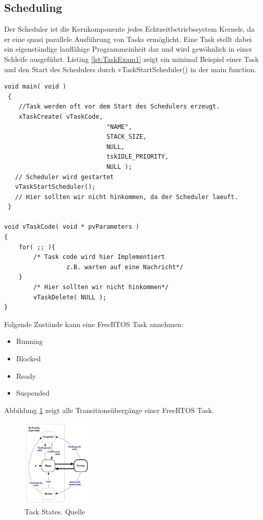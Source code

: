 \subsection{Scheduling}
\label{Scheduling}
Der Scheduler ist die Kernkomponente jedes Echtzeitbetriebssystem Kernels, da er eine quasi parallele Ausführung von Tasks ermöglicht. Eine Task stellt dabei ein ei\-gen\-stän\-di\-ge lauffähige Programmeinheit dar und wird gewöhnlich in einer Schleife ausgeführt. Listing \ref{lst:TaskExam1} zeigt ein minimal Beispiel einer Task und den Start des Schedulers durch vTaskStartScheduler() in der main function. 
\begin{lstlisting}[caption={Minimal Beispiel für die Definition eine Task. }, linewidth=8cm,captionpos=b, label=lst:TaskExam1, float=hbt]
 void main( void )
 {
	//Task werden oft vor dem Start des Schedulers erzeugt.
	xTaskCreate( vTaskCode,
							"NAME",
							STACK_SIZE,
							NULL,
							tskIDLE_PRIORITY,
							NULL );
   // Scheduler wird gestartet
   vTaskStartScheduler();
   // Hier sollten wir nicht hinkommen, da der Scheduler laeuft.
 }

void vTaskCode( void * pvParameters )
{
    for( ;; ){
        /* Task code wird hier Implementiert
				 z.B. warten auf eine Nachricht*/
    }
		/* Hier sollten wir nicht hinkommen*/
		vTaskDelete( NULL );
}
\end{lstlisting}
Folgende Zu\-stän\-de kann eine FreeRTOS Task annehmen: 
\begin{itemize}
	\item Running
	\item Blocked
	\item Ready
	\item Suspended
\end{itemize}
Abbildung \ref{fig:TaskStates} zeigt alle Tran\-si\-tions\-über\-gänge einer FreeRTOS Task. 
\begin{figure}[ht!]
	\centering
		\includegraphics[width=0.3\textwidth]{Pictures/FreeRTOSOrg/taskStates.png}
	\caption{Task States. Quelle~\protect{}}
	\label{fig:TaskStates}
\end{figure}
